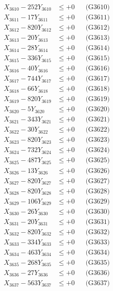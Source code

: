 \documentclass[a4paper,10pt]{article}
\begin{document}
{\begin{align}
X_{3610} - 252Y_{3610} &\leq +0 && \text{(G3610)} \\
\allowbreak
X_{3611} - 17Y_{3611} &\leq +0 && \text{(G3611)} \\
X_{3612} - 820Y_{3612} &\leq +0 && \text{(G3612)} \\
X_{3613} - 20Y_{3613} &\leq +0 && \text{(G3613)} \\
X_{3614} - 28Y_{3614} &\leq +0 && \text{(G3614)} \\
X_{3615} - 336Y_{3615} &\leq +0 && \text{(G3615)} \\
X_{3616} - 40Y_{3616} &\leq +0 && \text{(G3616)} \\
X_{3617} - 744Y_{3617} &\leq +0 && \text{(G3617)} \\
X_{3618} - 66Y_{3618} &\leq +0 && \text{(G3618)} \\
X_{3619} - 820Y_{3619} &\leq +0 && \text{(G3619)} \\
X_{3620} - 5Y_{3620} &\leq +0 && \text{(G3620)} \\
\allowbreak
X_{3621} - 343Y_{3621} &\leq +0 && \text{(G3621)} \\
X_{3622} - 30Y_{3622} &\leq +0 && \text{(G3622)} \\
X_{3623} - 820Y_{3623} &\leq +0 && \text{(G3623)} \\
X_{3624} - 732Y_{3624} &\leq +0 && \text{(G3624)} \\
X_{3625} - 487Y_{3625} &\leq +0 && \text{(G3625)} \\
X_{3626} - 13Y_{3626} &\leq +0 && \text{(G3626)} \\
X_{3627} - 820Y_{3627} &\leq +0 && \text{(G3627)} \\
X_{3628} - 820Y_{3628} &\leq +0 && \text{(G3628)} \\
X_{3629} - 106Y_{3629} &\leq +0 && \text{(G3629)} \\
X_{3630} - 26Y_{3630} &\leq +0 && \text{(G3630)} \\
\allowbreak
X_{3631} - 20Y_{3631} &\leq +0 && \text{(G3631)} \\
X_{3632} - 820Y_{3632} &\leq +0 && \text{(G3632)} \\
X_{3633} - 334Y_{3633} &\leq +0 && \text{(G3633)} \\
X_{3634} - 463Y_{3634} &\leq +0 && \text{(G3634)} \\
X_{3635} - 268Y_{3635} &\leq +0 && \text{(G3635)} \\
X_{3636} - 27Y_{3636} &\leq +0 && \text{(G3636)} \\
X_{3637} - 563Y_{3637} &\leq +0 && \text{(G3637)} \\

\end{align}}
\end{document}
